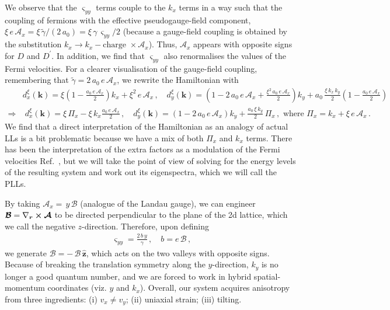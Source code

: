 \documentclass[aps,prb, onecolumn, nofootinbib, citeautoscript,10pt]{revtex4-2}
\newcommand{\bs}[1]{\boldsymbol{#1}}
\def \nn{\nonumber \\}
\begin{document}
We observe that the $\varsigma_{yy}$ terms couple to the $k_x$ terms in a way such that the coupling of fermions with the effective pseudogauge-field component, $ \xi\, e \,  \mathcal{A}_x = \xi \, \tilde \gamma /(2\, a_0) = \xi\, \gamma \, \varsigma_{yy} / 2 $ (because a gauge-field coupling is obtained by the substitution $k_x \rightarrow k_x - \text{charge } \times \mathcal{A}_x $). Thus, $ \mathcal{A}_x $ appears with opposite signs for $ D$ and $D^\prime$. In addition, we find that $\varsigma_{yy}$ also renormalises the values of the Fermi velocities. For a clearer visualisation of the gauge-field coupling, remembering that $  
\tilde \gamma  = 2\, a_0 \,e \,  \mathcal{A}_x $, we rewrite the Hamiltonian with
\begin{align}
 & d^\xi_x(\boldsymbol{k}) = \xi  \left (1 - \frac{ a_0 \,e \,  \mathcal{A}_x} {2}\right ) {k}_x 
+  \xi^2\,  e \,  \mathcal{A}_x  \,,
\quad d^\xi_y(\boldsymbol{k}) =
\left ( 1- 2\,a_0 \,e \,  \mathcal{A}_x  +  \frac{ \xi^2 \,a_0 \,e \,  \mathcal{A}_x} {2} 
\right )  k_y 
+  a_0\,\frac{ \xi\,k_x \, k_y}{2} \left (1 - \frac{ a_0 \,e \,  \mathcal{A}_x} {2}  \right ) \nn
\Rightarrow & \; d^\xi_x(\boldsymbol{k}) = \xi  \,\Pi_x
  - \xi\,k_x  \frac{ a_0 \,e \,  \mathcal{A}_x} {2} \,,
\quad d^\xi_y(\boldsymbol{k}) =
\left ( 1- 2\,a_0 \,e \,  \mathcal{A}_x \right )  k_y  
+  \frac{ a_0\,\xi \, k_y} {2} \,\Pi_x \,,
\text{ where } \Pi_x =  k_x +  \xi \,  e \,  \mathcal{A}_x \,.
\end{align}
We find that a direct interpretation of the Hamiltonian as an analogy of actual LLs is a bit problematic because we have a mix of both $\Pi_x$ and $k_x $ terms. There has been the interpretation of the extra factors as a modulation of the Fermi velocities Ref.~\cite{complex-LL-strained-graphene}, but we will take the point of view of solving for the energy levels of the resulting system and work out its eigenspectra, which we will call the PLLs.


By taking $\mathcal{A}_x = \, y\, {\mathcal B} $ (analogue of the Landau gauge), we can engineer $\bs{\mathcal B}= \nabla_{\bs r} \cross \bs{\mathcal A }$ to be directed perpendicular to the plane of the 2d lattice, which we call the negative $z$-direction. Therefore, upon defining
\begin{align}
 \varsigma_{yy} = \frac{2 \, b\, y} {\gamma} \,, \quad
b = e\, \mathcal B\,,
\end{align}
we generate $ \bs{\mathcal B} = -\,{\mathcal B} \, \bs{\hat z}$, which acts on the two valleys with opposite signs. Because of breaking the translation symmetry along the $y$-direction, $k_y $ is no longer a good quantum number, and we are forced to work in hybrid spatial-momentum coordinates (viz. $y$ and $k_x$). Overall, our system acquires anisotropy from three ingredients: (i) $ v_x \neq v_y$; (ii) uniaxial strain; (iii) tilting. 
\end{document}
